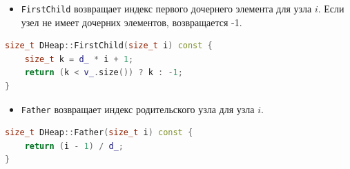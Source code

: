 \begin{itemize}[label=•, labelsep=1em]
    \item \texttt{FirstChild} возвращает индекс первого дочернего элемента для узла $i$. Если узел не имеет дочерних элементов, возвращается -1.
\end{itemize}
\begin{lstlisting}[language=C++]
size_t DHeap::FirstChild(size_t i) const {
    size_t k = d_ * i + 1;
    return (k < v_.size()) ? k : -1;
}
\end{lstlisting}

\begin{itemize}[label=•, labelsep=1em]
    \item \texttt{Father} возвращает индекс родительского узла для узла $i$.
\end{itemize}
\begin{lstlisting}[language=C++]
size_t DHeap::Father(size_t i) const {
    return (i - 1) / d_;
}
\end{lstlisting}
